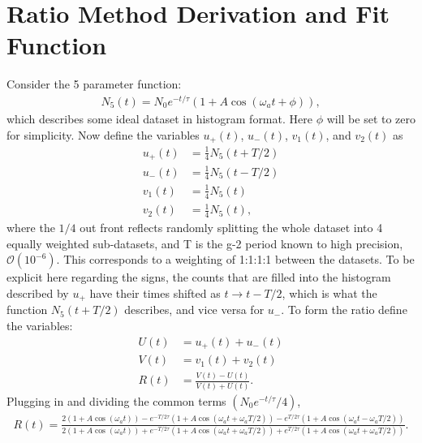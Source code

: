 
\thispagestyle{myheadings}

\chapter{Ratio Method Derivation and Fit Function}
\label{Appendix}

Consider the 5 parameter function:
	\begin{align}
		N_{5}(t) = N_{0}e^{-t/\tau}(1 + A \cos(\omega_{a}t + \phi)),
	\end{align}
which describes some ideal dataset in histogram format. Here $\phi$ will be set to zero for simplicity. Now define the variables $u_{+}(t)$, $u_{-}(t)$, $v_{1}(t)$, and $v_{2}(t)$ as
	\begin{equation}
	\begin{aligned}
		u_{+}(t) &= \frac{1}{4} N_{5}(t+T/2) \\
		u_{-}(t) &= \frac{1}{4} N_{5}(t-T/2) \\
		v_{1}(t) &= \frac{1}{4} N_{5}(t) \\
		v_{2}(t) &= \frac{1}{4} N_{5}(t),
	\end{aligned}
	\end{equation}
where the $1/4$ out front reflects randomly splitting the whole dataset into 4 equally weighted sub-datasets, and T is the g-2 period known to high precision, $\mathcal{O}(10^{-6})$. This corresponds to a weighting of 1:1:1:1 between the datasets. To be explicit here regarding the signs, the counts that are filled into the histogram described by $u_{+}$ have their times shifted as $t \rightarrow t - T/2$, which is what the function $N_{5}(t+T/2)$ describes, and vice versa for $u_{-}$. To form the ratio define the variables:
	\begin{equation}
	\begin{aligned}
		U(t) &= u_{+}(t) + u_{-}(t) \\
		V(t) &= v_{1}(t) + v_{2}(t) \\
		R(t) &= \frac{V(t) - U(t)}{V(t) + U(t)}.
	\end{aligned}
	\end{equation}
Plugging in and dividing the common terms $(N_{0}e^{-t/\tau}/4)$,
	\begin{align}
		R(t) = \frac{2(1 + A \cos(\omega_{a}t)) - e^{-T/ 2\tau} (1 + A \cos(\omega_{a}t + \omega_{a}T/2)) - e^{T/ 2\tau} (1 + A \cos(\omega_{a}t - \omega_{a}T/2))} {2(1 + A \cos(\omega_{a}t)) + e^{-T/ 2\tau} (1 + A \cos(\omega_{a}t + \omega_{a}T/2)) + e^{T/ 2\tau} (1 + A \cos(\omega_{a}t + \omega_{a}T/2))}.
	\end{align}

